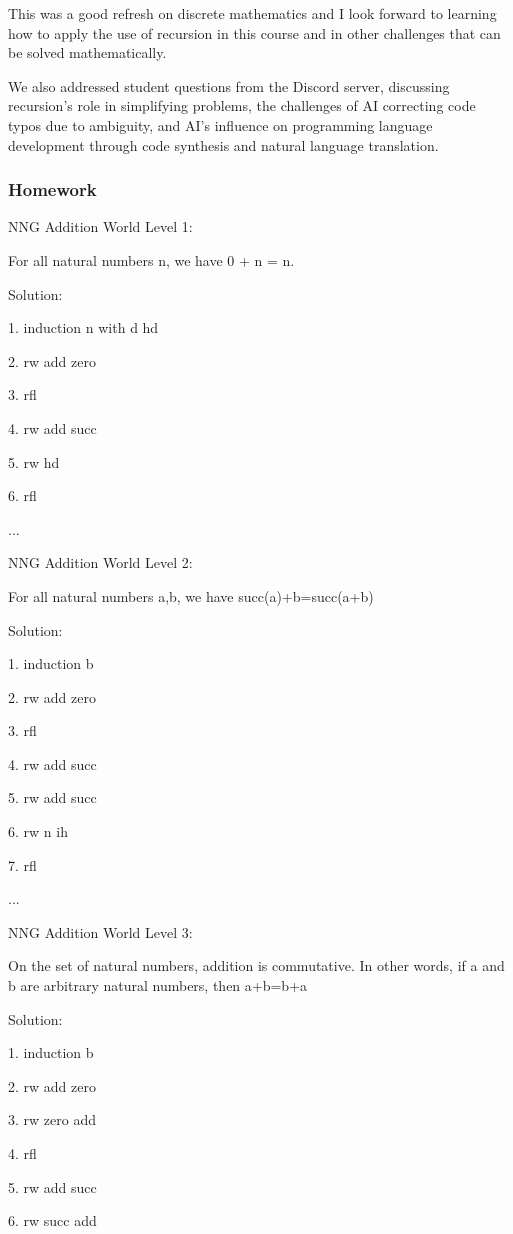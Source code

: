 \documentclass{article}
\theoremstyle{theorem}
\theoremstyle{definition}
\theoremstyle{remark}
\begin{document}
This was a good refresh on discrete mathematics and I look forward to learning how to apply the use of recursion in this course and in other challenges that can be solved mathematically.

We also addressed student questions from the Discord server, discussing recursion's role in simplifying problems, the challenges of AI correcting code typos due to ambiguity, and AI's influence on programming language development through code synthesis and natural language translation. 

\subsubsection*{Homework}

NNG Addition World Level 1:

For all natural numbers n, we have 0 + n = n.

Solution: 

1. induction n with d hd

2. rw add zero

3. rfl

4. rw add succ

5. rw hd

6. rfl

...

NNG Addition World Level 2:

For all natural numbers a,b, we have succ(a)+b=succ(a+b)

Solution: 

1. induction b

2. rw add zero

3. rfl

4. rw add succ

5. rw add succ

6. rw n ih

7. rfl

...

NNG Addition World Level 3:

On the set of natural numbers, addition is commutative. In other words, if a and b are arbitrary natural numbers, then a+b=b+a

Solution: 

1. induction b

2. rw add zero

3. rw zero add

4. rfl

5. rw add succ

6. rw succ add
\end{document}

